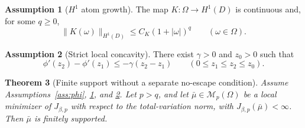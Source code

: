 \documentclass[11pt]{amsart}
\newtheorem{theorem}{Theorem}[section]
\theoremstyle{definition}
\newtheorem{assumption}[theorem]{Assumption}
\theoremstyle{remark}
\newcommand{\M}{\mathcal{M}}
\begin{document}
\begin{assumption}[$H^1$ atom growth]
\label{ass:H1-growth}
The map $K:\Omega\to H^1(D)$ is continuous and, for some $q\geq0$,
\begin{equation}
  \label{eq:H1-growth}
  \|K(\omega)\|_{H^1(D)}
  \leq C_K(1+|\omega|)^q
  \qquad(\omega\in\Omega).
\end{equation}
\end{assumption}

\begin{assumption}[Strict local concavity]
\label{ass:strict-concavity}
There exist $\gamma>0$ and $z_0>0$ such that
\[
  \phi'(z_2)-\phi'(z_1)
  \leq
  -\gamma(z_2-z_1)
  \qquad
  (0\leq z_1\leq z_2\leq z_0).
\]
\end{assumption}

\begin{theorem}[Finite support without a separate no-escape condition]
\label{thm:finite-support}
Assume Assumptions~\ref{ass:phi}, \ref{ass:H1-growth}, and
\ref{ass:strict-concavity}.  Let $p>q$, and let
$\bar\mu\in\M_p(\Omega)$ be a local minimizer of $J_{\beta,p}$ with respect
to the total-variation norm, with $J_{\beta,p}(\bar\mu)<\infty$.
Then $\bar\mu$ is finitely supported.
\end{theorem}
\end{document}
